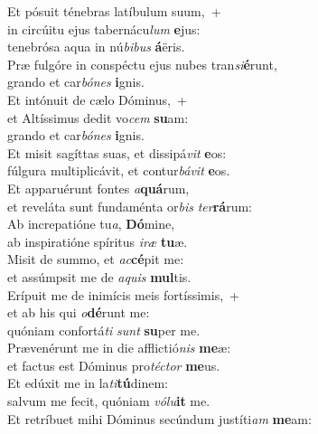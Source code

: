 \oddverse Et pósuit ténebras latíbulum suum,~+\\
\oddverse  in circúitu ejus tabernácu\textit{lum} \textbf{e}jus:~\*\\
\oddverse tenebrósa aqua in nú\textit{bi}\textit{bus} \textbf{á}ëris.\\
\evenverse Præ fulgóre in conspéctu ejus nubes tran\textit{si}\textbf{é}runt,~\*\\
\evenverse grando et car\textit{bó}\textit{nes} \textbf{i}gnis.\\
\oddverse Et intónuit de cælo Dóminus,~+\\
\oddverse  et Altíssimus dedit vo\textit{cem} \textbf{su}am:~\*\\
\oddverse grando et car\textit{bó}\textit{nes} \textbf{i}gnis.\\
\evenverse Et misit sagíttas suas, et dissipá\textit{vit} \textbf{e}os:~\*\\
\evenverse fúlgura multiplicávit, et contur\textit{bá}\textit{vit} \textbf{e}os.\\
\oddverse Et apparuérunt fontes \textit{a}\textbf{quá}rum,~\*\\
\oddverse et reveláta sunt fundaménta or\textit{bis} \textit{ter}\textbf{rá}rum:\\
\evenverse Ab increpatióne tu\textit{a}, \textbf{Dó}mine,~\*\\
\evenverse ab inspiratióne spíritus \textit{i}\textit{ræ} \textbf{tu}æ.\\
\oddverse Misit de summo, et \textit{ac}\textbf{cé}pit me:~\*\\
\oddverse et assúmpsit me de \textit{a}\textit{quis} \textbf{mul}tis.\\
\evenverse Erípuit me de inimícis meis fortíssimis,~+\\
\evenverse  et ab his qui \textit{o}\textbf{dé}runt me:~\*\\
\evenverse quóniam confortá\textit{ti} \textit{sunt} \textbf{su}per me.\\
\oddverse Prævenérunt me in die afflictió\textit{nis} \textbf{me}æ:~\*\\
\oddverse et factus est Dóminus pro\textit{té}\textit{ctor} \textbf{me}us.\\
\evenverse Et edúxit me in la\textit{ti}\textbf{tú}dinem:~\*\\
\evenverse salvum me fecit, quóniam \textit{vó}\textit{lu}\textbf{it} me.\\
\oddverse Et retríbuet mihi Dóminus secúndum justíti\textit{am} \textbf{me}am:~\*\\
